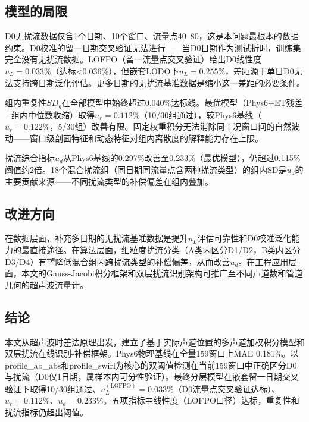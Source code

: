 \subsection{模型的局限}

D0无扰流数据仅含1个日期、10个窗口、流量点40--80，这是本问题最根本的数据约束。D0校准的留一日期交叉验证无法进行——当D0日期作为测试折时，训练集完全没有无扰流数据。LOFPO（留一流量点交叉验证）给出D0线性度$u_L=0.033\%$（达标<0.036\%），但嵌套LODO下$u_L=0.255\%$，差距源于单日D0无法支持跨日期泛化评估。更多日期的无扰流基准数据是缩小这一差距的必要条件。

组内重复性$SD_g$在全部模型中始终超过0.040\%达标线。最优模型（Phys6+ET残差+组内中位数收缩）取得$u_r=0.112\%$（10/30组通过），较Phys6基线（$u_r=0.122\%$，5/30组）改善有限。固定权重积分无法消除同工况窗口间的自然波动——窗口级剖面特征和动态特征对组内离散度的解释能力存在上限。

扰流综合指标$u_d$从Phys6基线的0.297\%改善至0.233\%（最优模型），仍超过0.115\%阈值约2倍。18个混合扰流组（同日期同流量点含两种扰流类型）的组内SD是$u_d$的主要贡献来源——不同扰流类型的补偿偏差在组内叠加。

\subsection{改进方向}

在数据层面，补充多日期的无扰流基准数据是提升$u_L$评估可靠性和D0校准泛化能力的最直接途径。在算法层面，细粒度扰流分类（A类内区分D1/D2，B类内区分D3/D4）有望降低混合组内跨扰流类型的补偿偏差，从而改善$u_d$。在工程应用层面，本文的Gauss-Jacobi积分框架和双层扰流识别架构可推广至不同声道数和管道几何的超声波流量计。

\subsection{结论}

本文从超声波时差法原理出发，建立了基于实际声道位置的多声道加权积分模型和双层扰流在线识别-补偿框架。Phys6物理基线在全量159窗口上MAE 0.181\%。以profile\_ab\_abs和profile\_swirl为核心的双阈值检测在当前159窗口中正确区分D0与扰流（D0仅1日期，属样本内可分性验证）。最终分层模型在嵌套留一日期交叉验证下取得10/30组通过、$u_L^{(\text{LOFPO})}=0.033\%$（D0流量点交叉验证达标）、$u_r=0.112\%$、$u_d=0.233\%$。五项指标中线性度（LOFPO口径）达标，重复性和扰流指标仍超出阈值。
